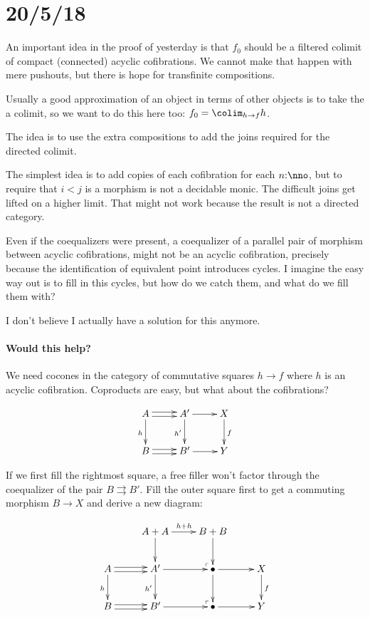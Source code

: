 \documentclass[csh.tex]{subfiles}
\makeatletter
\newcommand\pushout{\ar@{}[dr]|(.9)\ulcorner}
\newcommand\parr{\ar@<.5ex>[r]\ar@<-.5ex>[r]}
\makeatother
\begin{document}
\section{20/5/18}
An important idea in the proof of yesterday is that $f_0$ should be a filtered colimit of compact (connected) acyclic cofibrations. We cannot make that happen with mere pushouts, but there is hope for transfinite compositions.

Usually a good approximation of an object in terms of other objects is to take the a colimit, so we want to do this here too: $f_0 = \colim_{h\to f}h$.

The idea is to use the extra compositions to add the joins required for the directed colimit.

The simplest idea is to add copies of each cofibration for each $n\of \nno$, but to require that $i < j$ is a morphism is not a decidable monic. The difficult joins get lifted on a higher limit. That might not work because the result is not a directed category. 

Even if the coequalizers were present, a coequalizer of a parallel pair of morphism between acyclic cofibrations, might not be an acyclic cofibration, precisely because the identification of equivalent point introduces cycles. I imagine the easy way out is to fill in this cycles, but how do we catch them, and what do we fill them with?

I don't believe I actually have a solution for this anymore.

\paragraph{Would this help?}
We need cocones in the category of commutative squares $h\to f$ where $h$ is an acyclic cofibration. Coproducts are easy, but what about the cofibrations?

\[\xymatrix{
A\parr\ar[d]_h & A'\ar[r]\ar[d]_{h'} & X\ar[d]^f\\
B\parr & B'\ar[r] & Y
}\]

If we first fill the rightmost square, a free filler won't factor through the coequalizer of the pair $B\rightrightarrows B'$. Fill the outer square first to get a commuting morphism $B\to X$ and derive a new diagram:

\[\xymatrix{
& A+A \ar[r]^{h+h}\ar[d]\pushout & B+B\ar[d] \\
A\parr\ar[d]_h & A' \ar[r]\ar[d]_{h'}\pushout & \bullet \ar[r]\ar[d] & X\ar[d]^f\\
B\parr & B' \ar[r] & \bullet \ar[r] & Y
}\]
\end{document}
